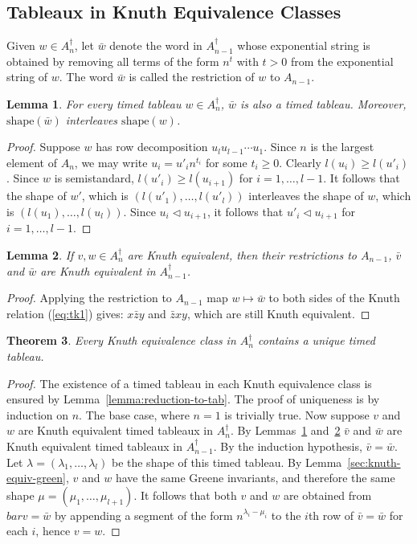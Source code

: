 \documentclass[10pt]{amsproc}
\newtheorem{theorem}{Theorem}[subsection]
\newtheorem{lemma}[theorem]{Lemma}
\theoremstyle{definition}
\theoremstyle{remark}
\newcommand{\shape}{\mathrm{shape}}
\begin{document}
\subsection{Tableaux in Knuth Equivalence Classes}
\label{sec:tabl-knuth-equiv}
Given $w\in A_n^\dagger$, let $\bar w$ denote the word in $A_{n-1}^\dagger$ whose exponential string is obtained by removing all terms of the form $n^t$ with $t>0$ from the exponential string of $w$.
The word $\bar w$ is called the restriction of $w$ to $A_{n-1}$.
\begin{lemma}
  \label{lemma:restriction-interleaf}
  For every timed tableau $w\in A_n^\dagger$, $\bar w$ is also a timed tableau. Moreover, $\shape(\bar w)$ interleaves $\shape(w)$.
\end{lemma}
\begin{proof}
  Suppose $w$ has row decomposition $u_lu_{l-1}\dotsb u_1$.
  Since $n$ is the largest element of $A_n$, we may write $u_i=u'_in^{t_i}$ for some $t_i\geq 0$.
  Clearly $l(u_i)\geq l(u'_i)$.
  Since $w$ is semistandard, $l(u'_i)\geq l(u_{i+1})$ for $i=1,\dotsc,l-1$. 
  It follows that the shape of $w'$, which is $(l(u'_1),\dotsc,l(u'_l))$ interleaves the shape of $w$, which is $(l(u_1),\dotsc,l(u_l))$.
  Since $u_i\lhd u_{i+1}$, it follows that $u'_i\lhd u_{i+1}$ for $i=1,\dotsc,l-1$.
\end{proof}
\begin{lemma}
  \label{lemma:equivalence-restriction}
  If $v,w\in A_n^\dagger$ are Knuth equivalent, then their restrictions to $A_{n-1}$, $\bar v$ and $\bar w$ are Knuth equivalent in $A_{n-1}^\dagger$.
\end{lemma}
\begin{proof}
  Applying the restriction to $A_{n-1}$ map $w\mapsto \bar w$ to both sides of the Knuth relation (\ref{eq:tk1}) gives:
  $x\bar z y$ and $\bar z x y$, which are still Knuth equivalent.
\end{proof}
\begin{theorem}
  \label{theorem:unique-timed-tableaux}
  Every Knuth equivalence class in $A_n^\dagger$ contains a unique timed tableau.
\end{theorem}
\begin{proof}
  The existence of a timed tableau in each Knuth equivalence class is ensured by Lemma~\ref{lemma:reduction-to-tab}.
  The proof of uniqueness is by induction on $n$.
  The base case, where $n=1$ is trivially true.
  Now suppose $v$ and $w$ are Knuth equivalent timed tableaux in $A_n^\dagger$.
  By Lemmas~\ref{lemma:restriction-interleaf} and~\ref{lemma:equivalence-restriction} $\bar v$ and $\bar w$ are Knuth equivalent timed tableaux in $A_{n-1}^\dagger$.
  By the induction hypothesis, $\bar v=\bar w$.
  Let $\lambda=(\lambda_1,\dotsc,\lambda_l)$ be the shape of this timed tableau.
  By Lemma~\ref{sec:knuth-equiv-green}, $v$ and $w$ have the same Greene invariants, and therefore the same shape $\mu=(\mu_1,\dotsc,\mu_{l+1})$.
  It follows that both $v$ and $w$ are obtained from $bar v=\bar w$ by appending a segment of the form $n^{\lambda_i-\mu_i}$ to the $i$th row of $\bar v= \bar w$ for each $i$, hence $v=w$.
\end{proof}
\end{document}
